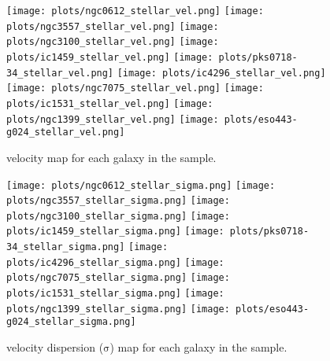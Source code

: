 \documentclass[fleqn,usenatbib,useAMS]{mnras}
\begin{document}
        \begin{figure*}
            \centering
            \texttt{[image: plots/ngc0612\_stellar\_vel.png]}
            \texttt{[image: plots/ngc3557\_stellar\_vel.png]}
            \texttt{[image: plots/ngc3100\_stellar\_vel.png]}
            \texttt{[image: plots/ic1459\_stellar\_vel.png]}
            \texttt{[image: plots/pks0718-34\_stellar\_vel.png]}
            \texttt{[image: plots/ic4296\_stellar\_vel.png]}
            \texttt{[image: plots/ngc7075\_stellar\_vel.png]}
            \texttt{[image: plots/ic1531\_stellar\_vel.png]}
            \texttt{[image: plots/ngc1399\_stellar\_vel.png]}
            \texttt{[image: plots/eso443-g024\_stellar\_vel.png]}
            \caption{ velocity map for each galaxy in the sample.}
            \label{fig:stellar_vel}
        \end{figure*}


        \begin{figure*}
            \centering
            \texttt{[image: plots/ngc0612\_stellar\_sigma.png]}
            \texttt{[image: plots/ngc3557\_stellar\_sigma.png]}
            \texttt{[image: plots/ngc3100\_stellar\_sigma.png]}
            \texttt{[image: plots/ic1459\_stellar\_sigma.png]}
            \texttt{[image: plots/pks0718-34\_stellar\_sigma.png]}
            \texttt{[image: plots/ic4296\_stellar\_sigma.png]}
            \texttt{[image: plots/ngc7075\_stellar\_sigma.png]}
            \texttt{[image: plots/ic1531\_stellar\_sigma.png]}
            \texttt{[image: plots/ngc1399\_stellar\_sigma.png]}
            \texttt{[image: plots/eso443-g024\_stellar\_sigma.png]}
            \caption{ velocity dispersion ($\mathrm{\sigma}$) map for each galaxy in the sample.}
            \label{fig:stellar_sigma}
        \end{figure*}
\end{document}
